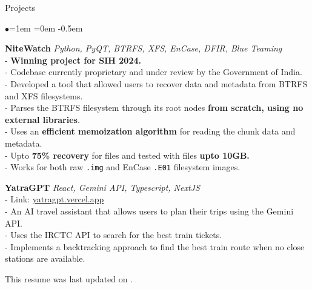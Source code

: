\documentclass{resume} %
\begin{document}
\begin{rSection}{Projects}
\begin{list}{$\bullet$}{\leftmargin=1em \itemindent=0em}
\itemsep -0.5em
\item {\bf NiteWatch} \hfill {\em Python, PyQT, BTRFS, XFS, EnCase, DFIR, Blue Teaming} \\
- \textbf{Winning project for SIH 2024.} \\
- Codebase currently proprietary and under review by the Government of India. \\
- Developed a tool that allowed users to recover data and metadata from BTRFS and XFS filesystems. \\
- Parses the BTRFS filesystem through its root nodes \textbf{from scratch, using no external libraries}. \\
- Uses an \textbf{efficient memoization algorithm} for reading the chunk data and metadata. \\
- Upto \textbf{75\% recovery} for files and tested with files \textbf{upto 10GB.} \\
- Works for both raw \texttt{.img} and EnCase \texttt{.E01} filesystem images.
\item {\bf YatraGPT} \hfill {\em React, Gemini API, Typescript, NextJS} \\
- Link: \href{https://yatragpt.vercel.app}{yatragpt.vercel.app} \\
- An AI travel assistant that allows users to plan their trips using the Gemini API. \\
- Uses the IRCTC API to search for the best train tickets. \\
- Implements a backtracking approach to find the best train route when no close stations are available. \\
\end{list}
\end{rSection}

\small \begin{center}This resume was last updated on \DTMnow.\\\end{center}
\end{document}
